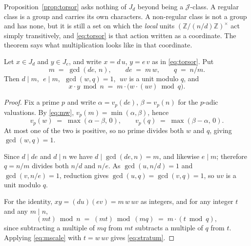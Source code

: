 Proposition~\ref{prop:torsor} asks nothing of $J_{d}$ beyond being a $\mathcal{J}$-class. A
regular class is a group and carries its own characters. A non-regular class is not a group
and has none, but it is still a set on which the \emph{local} units
$(\mathbb{Z}/(n/d)\mathbb{Z})^{\times}$ act simply transitively, and
\eqref{eq:torsor} is that action written as a coordinate. The theorem says what
multiplication looks like in that coordinate.

\begin{theorem}
\label{thm:stratum}
Let $x \in J_{d}$ and $y \in J_{e}$, and write $x = d\,u$, $y = e\,v$ as in
\eqref{eq:torsor}. Put
\begin{equation}
  \label{eq:mw}
  m \;=\; \gcd(de,\, n), \qquad de \;=\; m\,w, \qquad q \;=\; n/m .
\end{equation}
Then $d \mid m$, $\;e \mid m$, $\;\gcd(w, q) = 1$, $\;uv$ is a unit modulo $q$, and
\begin{equation}
  \label{eq:stratum}
  x \cdot y \bmod n \;=\; m \cdot \bigl( w \cdot (u v) \bmod q \bigr).
\end{equation}
\end{theorem}

\begin{proof}
Fix a prime $p$ and write $\alpha = v_{p}(de)$, $\beta = v_{p}(n)$ for the $p$-adic
valuations. By \eqref{eq:mw}, $v_{p}(m) = \min(\alpha, \beta)$, hence
\begin{equation}
  \label{eq:valuations}
  v_{p}(w) \;=\; \max(\alpha - \beta,\, 0),
  \qquad
  v_{p}(q) \;=\; \max(\beta - \alpha,\, 0) .
\end{equation}
At most one of the two is positive, so no prime divides both $w$ and $q$, giving
$\gcd(w, q) = 1$.

Since $d \mid de$ and $d \mid n$ we have $d \mid \gcd(de, n) = m$, and likewise $e \mid m$;
therefore $q = n/m$ divides both $n/d$ and $n/e$. As $\gcd(u, n/d) = 1$ and
$\gcd(v, n/e) = 1$, reduction gives $\gcd(u, q) = \gcd(v, q) = 1$, so $uv$ is a unit
modulo $q$.

For the identity, $xy = (du)(ev) = m\,w\,uv$ as integers, and for any integer $t$ and any
$m \mid n$,
\begin{equation}
  \label{eq:mscale}
  (m t) \bmod n \;=\; (m t) \bmod (m q) \;=\; m \cdot (t \bmod q),
\end{equation}
since subtracting a multiple of $mq$ from $mt$ subtracts a multiple of $q$ from $t$. Applying
\eqref{eq:mscale} with $t = w\,uv$ gives \eqref{eq:stratum}.
\end{proof}

